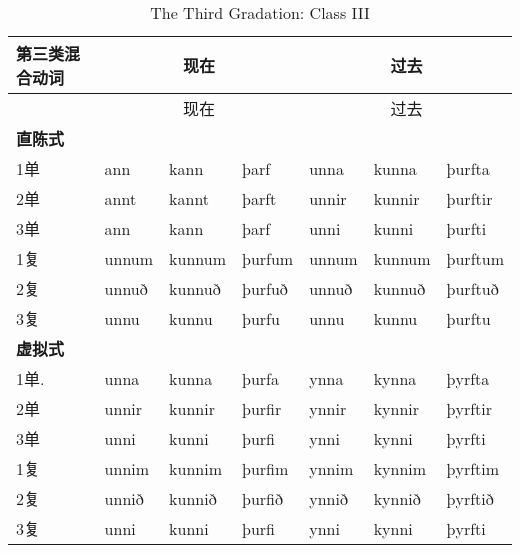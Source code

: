 \begin{longtable}{lllllll}
  \caption[The Third Gradation: Class III]{The Third Gradation: Class
    III}\tabularnewline
  \toprule
  第三类混合动词      & \multicolumn{3}{c}{现在} & \multicolumn{3}{c}{过去}                                         \\\midrule\endfirsthead{} &\multicolumn{3}{c}{现在} &\multicolumn{3}{c}{过去} \\
  \midrule
  \endhead
  \bottomrule
  \endfoot
  \textbf{直陈式} & ~                      & ~                      & ~        & ~       & ~      & ~       \\
  1单           & ann                    & kann                   & þarf     & unna    & kunna  & þurfta  \\
  2单           & annt                   & kannt                  & þarft    & unnir   & kunnir & þurftir \\
  3单           & ann                    & kann                   & þarf     & unni    & kunni  & þurfti  \\
  1复           & unnum                  & kunnum                 & þurfum   & unnum   & kunnum & þurftum \\
  2复           & unnuð                  & kunnuð                 & þurfuð   & unnuð   & kunnuð & þurftuð \\
  3复           & unnu                   & kunnu                  & þurfu    & unnu    & kunnu  & þurftu  \\
  \textbf{虚拟式} & ~                      & ~                      & ~        & ~       & ~      & ~       \\
  1单.          & unna                   & kunna                  & þurfa    & ynna    & kynna  & þyrfta  \\
  2单           & unnir                  & kunnir                 & þurfir   & ynnir   & kynnir & þyrftir \\
  3单           & unni                   & kunni                  & þurfi    & ynni    & kynni  & þyrfti  \\
  1复           & unnim                  & kunnim                 & þurfim   & ynnim   & kynnim & þyrftim \\
  2复           & unnið                  & kunnið                 & þurfið   & ynnið   & kynnið & þyrftið \\
  3复           & unni                   & kunni                  & þurfi    & ynni    & kynni  & þyrfti  \\

\end{longtable}
